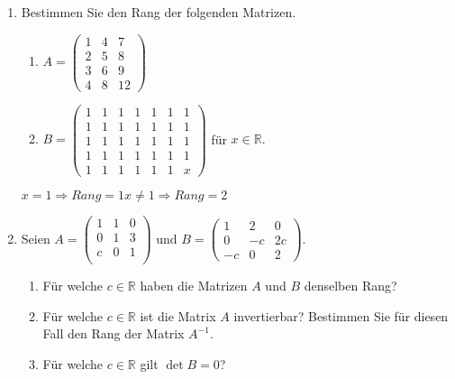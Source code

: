 \documentclass[12pt,a4paper]{scrreprt}
\newcommand{\R}{\mathds{R}}
\newcommand{\Lsg}{\textbf{Lsg.:}}
\begin{document}
\begin{enumerate}


	\item Bestimmen Sie den Rang der folgenden Matrizen. %
	\begin{enumerate}
		\item $A=\begin{pmatrix}
 1 & 4 & 7 \\
 2 & 5 & 8 \\
 3 & 6 & 9 \\
 4 & 8 & 12 \end{pmatrix}$
		\item $B=\begin{pmatrix}
 1 & 1 & 1 & 1 & 1 & 1 & 1\\
 1 & 1 & 1 & 1 & 1 & 1 & 1 \\
 1 & 1 & 1 & 1 & 1 & 1 & 1\\
 1 & 1 & 1 & 1 & 1 & 1 & 1 \\
 1 & 1 & 1 & 1 & 1 & 1 & x \end{pmatrix}$ für $x \in \R.$
	\end{enumerate}

$
x=1 \Rightarrow Rang=1
x\neq 1 \Rightarrow Rang=2
$

	\item Seien $A=\begin{pmatrix}
 1 & 1 & 0 \\
 0 & 1 & 3 \\
 c & 0 & 1 \\ \end{pmatrix}$
 und $B=\begin{pmatrix}
 1 & 2 & 0 \\
 0 & -c & 2c \\
-c & 0 & 2 \end{pmatrix}.$ 
	\begin{enumerate}
		\item Für welche $c \in \R$ haben die Matrizen $A$ und $B$ denselben Rang?
		\item Für welche $c \in \R$ ist die Matrix $A$ invertierbar? Bestimmen Sie für diesen Fall den Rang der Matrix $A^{-1}$.
		\item Für welche $c \in \R$ gilt $\det B=0$?
	\end{enumerate}

\end{enumerate}
\end{document}
